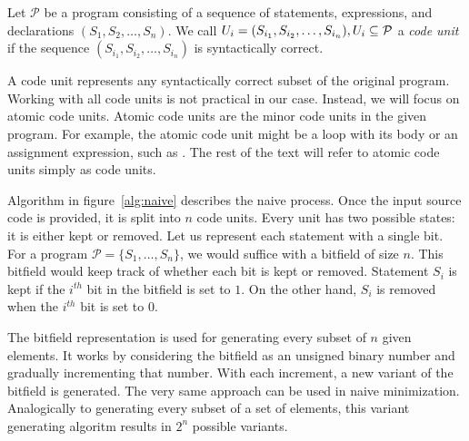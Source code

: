 \begin{defn}\label{def04:3}
  Let $\mathcal{P}$ be a program consisting of a sequence of statements, 
  expressions, and declarations $(S_1, S_2, \ldots, S_n)$. 
  We call $U_i = (S_{i_1},\-S_{i_2},\-\ldots,\-S_{i_n}), 
  U_i \subseteq \mathcal{P}$ a \emph{code unit} if the sequence 
  $(S_{i_1}, S_{i_2}, \ldots, S_{i_n})$ is syntactically
  correct.
\end{defn}

A code unit represents any syntactically correct subset of the original 
program. 
Working with all code units is not practical in our case. 
Instead, we will focus on atomic code units. 
Atomic code units are the minor code units in the given program. 
For example, the atomic code unit might be a  loop with its body 
or an assignment expression, such as .
The rest of the text will refer to atomic code units simply as code units. 

Algorithm in figure~\ref{alg:naive} describes the naive process. 
Once the input source code is provided, it is split into $n$ code units.
Every unit has two possible states: it is either kept or removed.
Let us represent each statement with a single bit. 
For a program $\mathcal{P} = \{S_1, \ldots, S_n\}$, we would suffice with 
a bitfield of size $n$. 
This bitfield would keep track of whether each bit is kept or removed. 
Statement $S_i$ is kept if the $i^{th}$ bit in the bitfield is set to $1$. 
On the other hand, $S_i$ is removed when the $i^{th}$ bit is set to $0$.

The bitfield representation is used for generating every subset of $n$ given
elements. 
It works by considering the bitfield as an unsigned binary number and 
gradually incrementing that number. 
With each increment, a new variant of the bitfield is generated. 
The very same approach can be used in naive minimization.
Analogically to generating every subset of a set of elements, this
variant generating algoritm results in $2^n$ possible variants.

